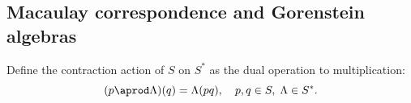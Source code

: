 \documentclass[a4paper,11p]{amsart}
\newtheorem{prop0}[defn0]{Proposition}
\newenvironment{proposition}{\bigskip \begin{prop0}}{\end{prop0}}
\newcommand{\K}{\mathbb K}
\begin{document}

\subsection{Macaulay correspondence and Gorenstein algebras}
Define the contraction action of $S$ on $S^*$ as the dual operation to multiplication:
\[
(p \aprod \Lambda)(q) = \Lambda(pq), \quad p,q \in S,\; \Lambda \in S^*.
\]
\end{document}
